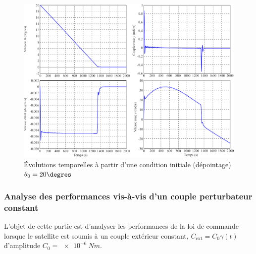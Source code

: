 \ifprof
\else

\begin{figure}[H]
\centering
\includegraphics[width=.8\linewidth]{images/fig_14}
\caption{Évolutions temporelles à partir d’une condition initiale (dépointage) $\theta_0 = 20\degres$ \label{fig_14}}
\end{figure}
\fi

\subsubsection{\label{sec:3:D:3} Analyse des performances vis-à-vis d’un couple perturbateur constant}

L’objet de cette partie est d’analyser les performances de la loi de commande lorsque le satellite est soumis à
un couple extérieur constant, $C_{\text{ext}}= C_0 \gamma(t)$ d’amplitude $C_0 =\SI{e-6}{Nm}$.

